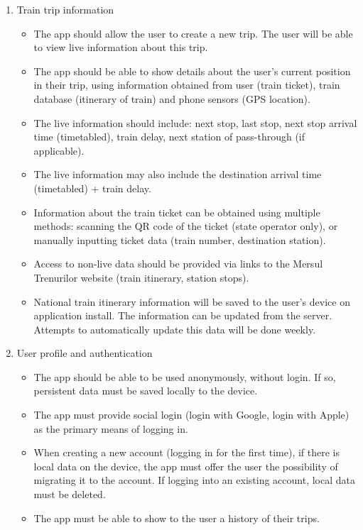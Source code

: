 \begin{enumerate}
    \item Train trip information
          \begin{itemize}
              \item The app should allow the user to create a new trip. The user will be able to view live information about this trip.
              \item The app should be able to show details about the user's current position in their trip, using information obtained from user (train ticket), train database (itinerary of train) and phone sensors (GPS location).
              \item The live information should include: next stop, last stop, next stop arrival time (timetabled), train delay, next station of pass-through (if applicable).
              \item The live information may also include the destination arrival time (time\-tabled) + train delay.
              \item Information about the train ticket can be obtained using multiple methods: scanning the QR code of the ticket (state operator only), or manually inputting ticket data (train number, destination station).
              \item Access to non-live data should be provided via links to the Mersul Trenu\-rilor website (train itinerary, station stops).
              \item National train itinerary information will be saved to the user's device on application install. The information can be updated from the server. Attempts to automatically update this data will be done weekly.
          \end{itemize}
    \item User profile and authentication
          \begin{itemize}
              \item The app should be able to be used anonymously, without login. If so, persistent data must be saved locally to the device.
              \item The app must provide social login (login with Google, login with Apple) as the primary means of logging in.
              \item When creating a new account (logging in for the first time), if there is local data on the device, the app must offer the user the possibility of migrating it to the account. If logging into an existing account, local data must be deleted.
              \item The app must be able to show to the user a history of their trips.

\end{itemize}
\end{enumerate}
